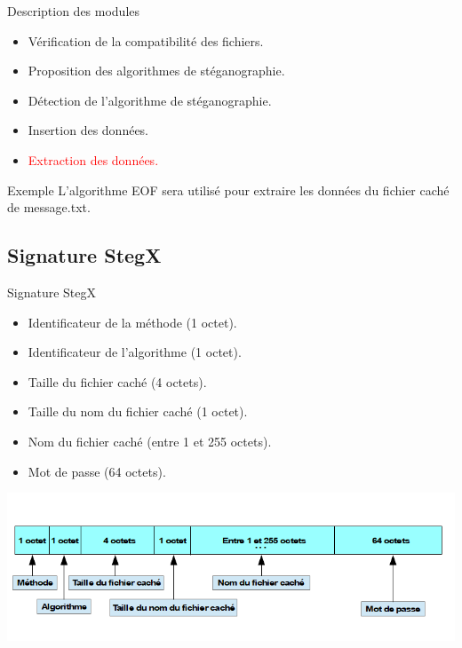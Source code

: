 \documentclass{beamer}
\begin{document}
  \begin{frame} %
	\begin{block}{Description des modules}
	\begin{itemize}
	[circle]
	\item Vérification de la compatibilité des fichiers.
	\item Proposition des algorithmes de stéganographie.
	\item Détection de l'algorithme de stéganographie.
	\item Insertion des données.
	\item \textcolor{red}{Extraction des données.}
	\end{itemize}
	\end{block}
	
	\begin{exampleblock}{Exemple} 
	L'algorithme EOF sera utilisé pour extraire les  données du fichier 
	caché de message.txt. 
	\end{exampleblock}
  \end{frame}
  	

  
  \subsection{Signature StegX}
  
  \begin{frame}
  
  \begin{block}{Signature StegX}
	\begin{itemize}
	[circle]
	\item Identificateur de la méthode (1 octet).
	\item Identificateur de l'algorithme (1 octet). 
	\item Taille du fichier caché (4 octets). 
	\item Taille du nom du fichier caché (1 octet). 
	\item Nom du fichier caché (entre 1 et 255 octets). 
	\item Mot de passe (64 octets).  
	\end{itemize}
	\end{block}
  
  \includegraphics[scale=0.55]{pictures/signature_6.png}
  \end{frame}
\end{document}
